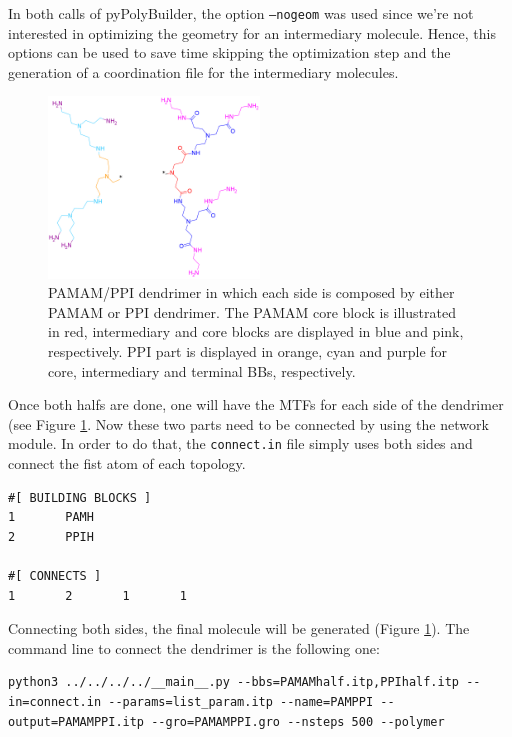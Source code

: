 In both calls of pyPolyBuilder, the option \texttt{--nogeom} was used since we're not interested in optimizing the geometry for an intermediary molecule. 
Hence, this options can be used to save time skipping the optimization step and the generation of a coordination file for the intermediary molecules.

\begin{figure}
    \centering
    \includegraphics[width=0.5\textwidth]{PAMAM_PPI-half/PAMAMPPIHalfs.png}
    \caption{PAMAM/PPI dendrimer in which each side is composed by either PAMAM or PPI dendrimer. The PAMAM core block is illustrated in red, intermediary and core blocks are displayed in blue and pink, respectively. PPI part is displayed in orange, cyan and purple for core, intermediary and terminal BBs, respectively. }
    \label{fig:HalfHalf}
\end{figure}

Once both halfs are done, one will have the MTFs for each side of the dendrimer (see Figure \ref{fig:HalfHalf}.
Now these two parts need to be connected by using the network module.
In order to do that, the \texttt{connect.in} file simply uses both sides and connect the fist atom of each topology.

\begin{lstlisting}
#[ BUILDING BLOCKS ]
1       PAMH
2       PPIH

#[ CONNECTS ]
1       2       1       1
\end{lstlisting}

Connecting both sides, the final molecule will be generated (Figure \ref{fig:HalfHalf}).
The command line to connect the dendrimer is the following one:

\begin{lstlisting}
python3 ../../../../__main__.py --bbs=PAMAMhalf.itp,PPIhalf.itp --in=connect.in --params=list_param.itp --name=PAMPPI --output=PAMAMPPI.itp --gro=PAMAMPPI.gro --nsteps 500 --polymer
\end{lstlisting}

